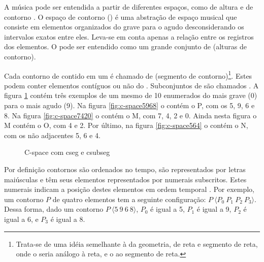 A música pode ser entendida a partir de diferentes espaços, como de
altura e de contorno \cite{morris87:composition}. O espaço de contorno
() é uma abstração de espaço musical que consiste em
elementos organizados do grave para o agudo desconsiderando os
intervalos exatos entre eles. Leva-se em conta apenas a relação entre
os registros dos elementos. O  pode ser entendido como
um grande conjunto de  (alturas de contorno).  

Cada contorno de  contido em um  é
chamado de  (segmento de contorno)\footnote{Trata-se de
  uma idéia semelhante à da geometria, de reta e segmento de reta,
  onde o  seria análogo à reta, e o  ao
  segmento de reta.}. Estes  podem conter elementos
contíguos ou não do . Subconjuntos de  são
chamados . A figura \ref{fig:c-space} contém três
exemplos de um mesmo  de 10  enumerados
do mais grave (0) para o mais agudo (9). Na figura
\ref{fig:c-space5968} o  contém o  P, com
os  5, 9, 6 e 8. Na figura \ref{fig:c-space7420} o
 contém o  M, com  7, 4, 2 e
0. Ainda nesta figura o  M contém o  O, com
 4 e 2. Por último, na figura \ref{fig:c-space564} o
 contém o  N, com os  não
adjacentes 5, 6 e 4.

\begin{figure}
  \centering
  \caption{C-space com cseg e csubseg}
  \label{fig:c-space}
\end{figure}

Por definição contornos são ordenados no tempo, são representados por
letras maiúsculas e têm seus elementos representados por numerais
subscritos. Estes numerais indicam a posição destes elementos em ordem
temporal \cite{marvin.ea87:relating}. Por exemplo, um contorno $P$ de
quatro elementos tem a seguinte configuração: $P\:\langle
P_0\:P_1\:P_2\:P_3\rangle$. Dessa forma, dado um contorno
$P\:\langle5\:9\:6\:8\rangle$, $P_0$ é igual a 5, $P_1$ é igual a 9,
$P_2$ é igual a 6, e $P_3$ é igual a 8.

